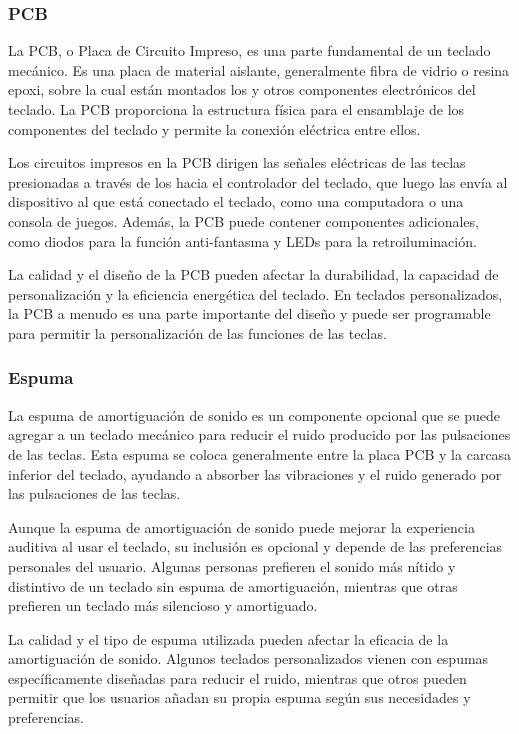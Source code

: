 \subsubsection{\gls{PCB}}

La \gls{PCB}, o Placa de Circuito Impreso, es una parte fundamental de un teclado mecánico. Es una placa de material aislante, generalmente fibra de vidrio o resina epoxi, sobre la cual están montados los  y otros componentes electrónicos del teclado. La \gls{PCB} proporciona la estructura física para el ensamblaje de los componentes del teclado y permite la conexión eléctrica entre ellos.

Los circuitos impresos en la \gls{PCB} dirigen las señales eléctricas de las teclas presionadas a través de los  hacia el controlador del teclado, que luego las envía al dispositivo al que está conectado el teclado, como una computadora o una consola de juegos. Además, la \gls{PCB} puede contener componentes adicionales, como diodos para la función anti-fantasma y \gls{LED}s para la retroiluminación.

La calidad y el diseño de la \gls{PCB} pueden afectar la durabilidad, la capacidad de personalización y la eficiencia energética del teclado. En teclados personalizados, la \gls{PCB} a menudo es una parte importante del diseño y puede ser programable para permitir la personalización de las funciones de las teclas.

\subsubsection{Espuma}

La espuma de amortiguación de sonido es un componente opcional que se puede agregar a un teclado mecánico para reducir el ruido producido por las pulsaciones de las teclas. Esta espuma se coloca generalmente entre la placa \gls{PCB} y la carcasa inferior del teclado, ayudando a absorber las vibraciones y el ruido generado por las pulsaciones de las teclas.

Aunque la espuma de amortiguación de sonido puede mejorar la experiencia auditiva al usar el teclado, su inclusión es opcional y depende de las preferencias personales del usuario. Algunas personas prefieren el sonido más nítido y distintivo de un teclado sin espuma de amortiguación, mientras que otras prefieren un teclado más silencioso y amortiguado.

La calidad y el tipo de espuma utilizada pueden afectar la eficacia de la amortiguación de sonido. Algunos teclados personalizados vienen con espumas específicamente diseñadas para reducir el ruido, mientras que otros pueden permitir que los usuarios añadan su propia espuma según sus necesidades y preferencias.


